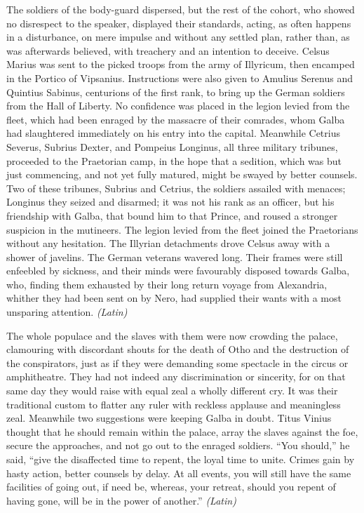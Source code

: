 The soldiers of the body-guard dispersed, but the rest of the cohort, who showed no disrespect to the speaker, displayed their standards, acting, as often happens in a disturbance, on mere impulse and without any settled plan, rather than, as was afterwards believed, with treachery and an intention to deceive. Celsus Marius was sent to the picked troops from the army of Illyricum, then encamped in the Portico of Vipsanius. Instructions were also given to Amulius Serenus and Quintius Sabinus, centurions of the first rank, to bring up the German soldiers from the Hall of Liberty. No confidence was placed in the legion levied from the fleet, which had been enraged by the massacre of their comrades, whom Galba had slaughtered immediately on his entry into the capital. Meanwhile Cetrius Severus, Subrius Dexter, and Pompeius Longinus, all three military tribunes, proceeded to the Praetorian camp, in the hope that a sedition, which was but just commencing, and not yet fully matured, might be swayed by better counsels. Two of these tribunes, Subrius and Cetrius, the soldiers assailed with menaces; Longinus they seized and disarmed; it was not his rank as an officer, but his friendship with Galba, that bound him to that Prince, and roused a stronger suspicion in the mutineers. The legion levied from the fleet joined the Praetorians without any hesitation. The Illyrian detachments drove Celsus away with a shower of javelins. The German veterans wavered long. Their frames were still enfeebled by sickness, and their minds were favourably disposed towards Galba, who, finding them exhausted by their long return voyage from Alexandria, whither they had been sent on by Nero, had supplied their wants with a most unsparing attention. \emph{(Latin)}


The whole populace and the slaves with them were now crowding the palace, clamouring with discordant shouts for the death of Otho and the destruction of the conspirators, just as if they were demanding some spectacle in the circus or amphitheatre. They had not indeed any discrimination or sincerity, for on that same day they would raise with equal zeal a wholly different cry. It was their traditional custom to flatter any ruler with reckless applause and meaningless zeal. Meanwhile two suggestions were keeping Galba in doubt. Titus Vinius thought that he should remain within the palace, array the slaves against the foe, secure the approaches, and not go out to the enraged soldiers. ``You should,'' he said, ``give the disaffected time to repent, the loyal time to unite. Crimes gain by hasty action, better counsels by delay. At all events, you will still have the same facilities of going out, if need be, whereas, your retreat, should you repent of having gone, will be in the power of another.'' \emph{(Latin)}


